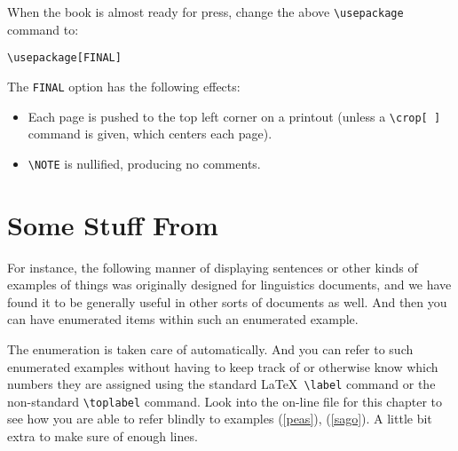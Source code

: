 \noindent
When the book is almost ready for press, change the above
\texttt{\backslash usepackage} command to:

   \smallskip
   \texttt{\backslash usepackage[{\smaller FINAL}]}
   \smallskip

\noindent
The \texttt{\smaller FINAL} option has the following effects:

\begin{itemize}
\item  Each page is pushed to the top left corner on a printout
       (unless a \texttt{\backslash crop[\,]} command is given, which
       centers each page).

\item  \texttt{\backslash NOTE\braced{\,}} is nullified, producing
       no comments.
\end{itemize}



\section{Some Stuff From \protect{}}


For instance, the following manner of displaying
sentences or other kinds of examples of
things was originally designed for linguistics documents, and we have
found it to be generally useful in other sorts of documents as well.
And then you can have enumerated items within such an enumerated
example.


The enumeration is taken care of automatically.
And you can refer to such enumerated examples without having to keep
track of or otherwise know which numbers they are assigned using
the standard \LaTeX\ \texttt{\backslash label\braced{\,}} command or
the non-standard \texttt{\backslash toplabel\braced{\,}} command.
Look into the
on-line file for this chapter to see how you are able to refer
blindly to examples (\ref{peas}), (\ref{sago}).  A little bit
extra to make sure of enough lines.



